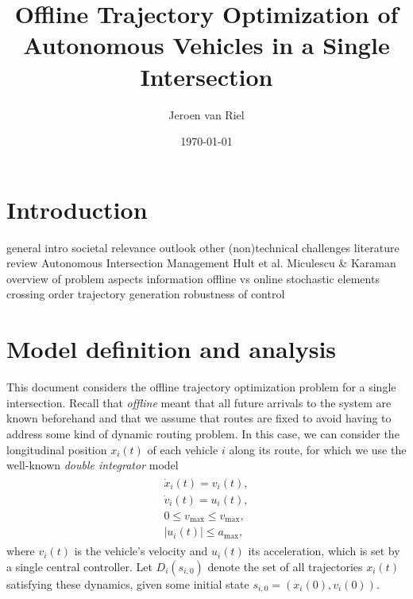 \documentclass[a4paper]{article}
\author{Jeroen van Riel}
\date{\monthyeardate\today}
\title{Offline Trajectory Optimization of Autonomous Vehicles in a Single Intersection}
\theoremstyle{definition}
\theoremstyle{plain}
\begin{document}
\maketitle

\tableofcontents

\section{Introduction}


\begin{outline}
  \1 general intro
  \2 societal relevance
  \2 outlook
  \2 other (non)technical challenges
  \1 literature review
  \2 Autonomous Intersection Management
  \2 Hult et al.
  \2 Miculescu \& Karaman
  \1 overview of problem aspects
  \2 information
  \3 offline vs online
  \3 stochastic elements
  \2 crossing order
  \2 trajectory generation
  \2 robustness of control
\end{outline}

\section{Model definition and analysis}

This document considers the offline trajectory optimization problem for a single
intersection. Recall that \textit{offline} meant that all future arrivals to the
system are known beforehand and that we assume that routes are fixed to avoid
having to address some kind of dynamic routing problem.
In this case, we can consider the longitudinal
position $x_{i}(t)$ of each vehicle $i$ along its route, for which we use the
well-known \textit{double integrator} model
\begin{gather}
  \label{eq:vehicle_dynamics}
\begin{aligned}
  \dot{x}_{i}(t) = v_{i}(t) , \\
  \dot{v}_{i}(t) = u_{i}(t)  , \\
  0 \leq v_{\max} \leq v_{\max} , \\
  |u_{i}(t) | \leq a_{\max} ,
\end{aligned}
\end{gather}
where $v_{i}(t)$ is the vehicle's velocity and $u_{i}(t)$ its acceleration,
which is set by a single central controller. Let $D_{i}(s_{i,0})$ denote the set of all
trajectories $x_{i}(t)$ satisfying these
dynamics, given some initial state $s_{i,0} = (x_{i}(0), v_{i}(0))$.
\end{document}
